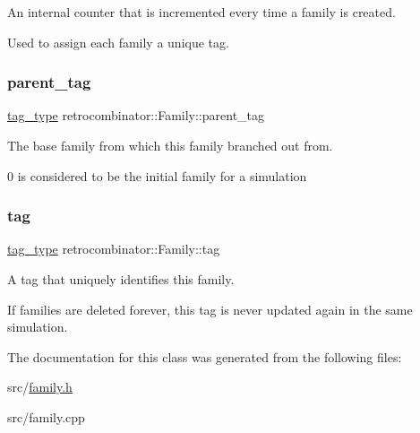 An internal counter that is incremented every time a family is created. 

Used to assign each family a unique tag. \mbox{\label{classretrocombinator_1_1Family_aa5885cd6d63468db43859a860f7f16b4}} 
\subsubsection{\texorpdfstring{parent\+\_\+tag}{parent\_tag}}
{\footnotesize\ttfamily \hyperlink{constants_8h_afd7c6eb4293e8c4d12827609a9a34b9b}{tag\+\_\+type} retrocombinator\+::\+Family\+::parent\+\_\+tag\hspace{0.3cm}{\ttfamily [private]}}



The base family from which this family branched out from. 

0 is considered to be the initial family for a simulation \mbox{\label{classretrocombinator_1_1Family_a50f0b448e39c126db2c12bdcac5a488d}} 
\subsubsection{\texorpdfstring{tag}{tag}}
{\footnotesize\ttfamily \hyperlink{constants_8h_afd7c6eb4293e8c4d12827609a9a34b9b}{tag\+\_\+type} retrocombinator\+::\+Family\+::tag\hspace{0.3cm}{\ttfamily [private]}}



A tag that uniquely identifies this family. 

If families are deleted forever, this tag is never updated again in the same simulation. 

The documentation for this class was generated from the following files\+:\begin{DoxyCompactItemize}
\item 
src/\hyperlink{family_8h}{family.\+h}\item 
src/family.\+cpp\end{DoxyCompactItemize}
